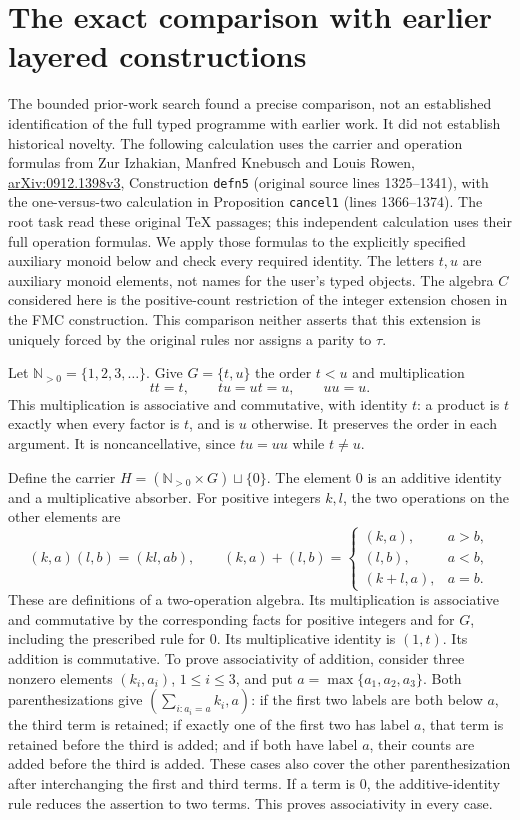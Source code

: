 \section{The exact comparison with earlier layered constructions}
\label{sec:layered-presence-comparison}

The bounded prior-work search found a precise comparison, not an established identification of the full typed programme with earlier work. It did not establish historical novelty. The following calculation uses the carrier and operation formulas from
Zur Izhakian, Manfred Knebusch and Louis Rowen,
\href{https://arxiv.org/abs/0912.1398v3}{arXiv:0912.1398v3},
Construction \texttt{defn5} (original source lines 1325--1341), with the one-versus-two calculation in Proposition \texttt{cancel1} (lines 1366--1374). The root task read these original TeX passages; this independent calculation uses their full operation formulas.  We apply those formulas to the explicitly
specified auxiliary monoid below and check every required identity.
The letters \(t,u\) are auxiliary monoid elements, not names for the
user's typed objects.  The algebra \(C\) considered here is the
positive-count restriction of the integer extension chosen in the FMC
construction.  This comparison neither asserts that this extension is
uniquely forced by the original rules nor assigns a parity to \(\tau\).

Let \(\mathbb N_{>0}=\{1,2,3,\ldots\}\).  Give \(G=\{t,u\}\) the order
\(t<u\) and multiplication
\[
tt=t,\qquad tu=ut=u,\qquad uu=u.
\tag{LPC1}\label{eq:LPC1}
\]
This multiplication is associative and commutative, with identity \(t\):
a product is \(t\) exactly when every factor is \(t\), and is \(u\)
otherwise.  It preserves the order in each argument.  It is
noncancellative, since \(tu=uu\) while \(t\ne u\).

Define the carrier \(H=(\mathbb N_{>0}\times G)\sqcup\{0\}\).
The element \(0\) is an additive identity and a multiplicative absorber.
For positive integers \(k,l\), the two operations on the other elements
are
\[
(k,a)(l,b)=(kl,ab),\qquad
(k,a)+(l,b)=
\begin{cases}
(k,a),&a>b,\\
(l,b),&a<b,\\
(k+l,a),&a=b.
\end{cases}
\tag{LPC2}\label{eq:LPC2}
\]
These are definitions of a two-operation algebra.  Its multiplication is
associative and commutative by the corresponding facts for positive
integers and for \(G\), including the prescribed rule for \(0\).
Its multiplicative identity is \((1,t)\).  Its addition is commutative.
To prove associativity of addition, consider three nonzero elements
\((k_i,a_i)\), \(1\leq i\leq3\), and put
\(a=\max\{a_1,a_2,a_3\}\).  Both parenthesizations give
\((\sum_{i:a_i=a}k_i,a)\): if the first two labels are both below \(a\),
the third term is retained; if exactly one of the first two has label
\(a\), that term is retained before the third is added; and if both have
label \(a\), their counts are added before the third is added.
These cases also cover the other parenthesization after interchanging
the first and third terms.  If a term is \(0\), the additive-identity
rule reduces the assertion to two terms.  This proves associativity in
every case.

